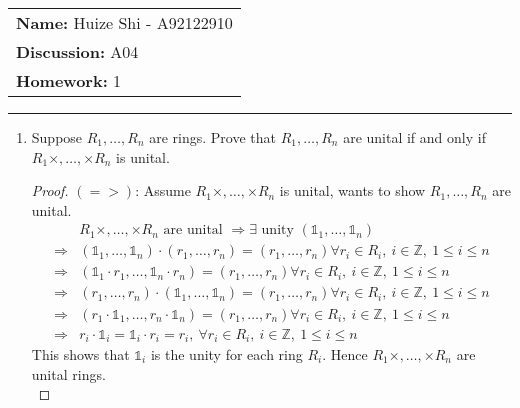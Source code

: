 \documentclass[12pt]{article}
\begin{document}
\null\hfill\begin{tabular}[t]{l@{}}
	\textbf{Name: }Huize Shi - A92122910 \\
	\textbf{Discussion: }A04 \\
	\textbf{Homework: }1
\end{tabular}
\noindent\rule{\textwidth}{0.5pt}

\begin{enumerate}
	\item Suppose $R_1, \dots, R_n$ are rings. Prove that $R_1, \dots, R_n$ are
		unital if and only if $R_1 \times, \dots, \times R_n$ is unital.
		\begin{proof} $(=>)$:
			Assume $R_1 \times, \dots, \times R_n$ is unital, wants to show $R_1,
			\dots, R_n$ are unital.
			\begin{align*}
				&R_1 \times, \dots, \times R_n \text{ are unital } \Rightarrow \exists
				\text{ unity }(\mathds{1}_1, \dots, \mathds{1}_n)\\
				\Rightarrow &(\mathds{1}_1, \dots, \mathds{1}_n) \cdot (r_1, \dots, r_n)
				= (r_1, \dots, r_n) \forall r_i \in R_i,\ i\in \mathbb{Z},\ 1 \le i \le n \\
				\Rightarrow &(\mathds{1}_1 \cdot r_1, \dots, \mathds{1}_n \cdot r_n) 
				= (r_1, \dots, r_n) \forall r_i \in R_i,\ i\in \mathbb{Z},\ 1 \le i \le n \\
				\Rightarrow &(r_1, \dots, r_n) \cdot (\mathds{1}_1, \dots, \mathds{1}_n) 
				= (r_1, \dots, r_n) \forall r_i \in R_i,\ i\in \mathbb{Z},\ 1 \le i \le
				n \\
				\Rightarrow &(r_1 \cdot \mathds{1}_1, \dots, r_n \cdot \mathds{1}_n) 
				= (r_1, \dots, r_n) \forall r_i \in R_i,\ i\in \mathbb{Z},\ 1 \le i \le n \\
				\Rightarrow &r_i \cdot \mathds{1}_i = \mathds{1}_i \cdot r_i = r_i,\
				\forall r_i \in R_i,\ i\in \mathbb{Z},\ 1 \le i \le n
			\end{align*}
			This shows that $\mathds{1}_i$ is the unity for each ring $R_i$. Hence
			$R_1 \times, \dots, \times R_n$ are unital rings. \\
			

\end{proof}
\end{enumerate}
\end{document}
